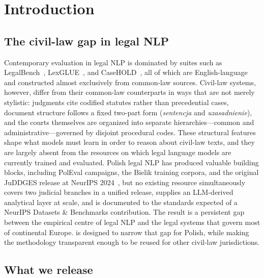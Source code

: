 
\section{Introduction}
\label{sec:introduction}

\subsection{The civil-law gap in legal NLP}
\label{sec:intro:gap}

Contemporary evaluation in legal NLP is dominated by suites such as LegalBench~\citep{guhaLegalbenchCollaborativelyBuilt2023a}, LexGLUE~\citep{chalkidis-etal-2022-lexglue}, and CaseHOLD~\citep{zheng2021does}, all of which are English-language and constructed almost exclusively from common-law sources. Civil-law systems, however, differ from their common-law counterparts in ways that are not merely stylistic: judgments cite codified statutes rather than precedential cases, document structure follows a fixed two-part form (\emph{sentencja} and \emph{uzasadnienie}), and the courts themselves are organized into separate hierarchies---common and administrative---governed by disjoint procedural codes. These structural features shape what models must learn in order to reason about civil-law texts, and they are largely absent from the resources on which legal language models are currently trained and evaluated. Polish legal NLP has produced valuable building blocks, including PolEval campaigns, the Bielik training corpora, and the original JuDDGES release at NeurIPS 2024~\citep{augustyniak2024juddges}, but no existing resource simultaneously covers two judicial branches in a unified release, supplies an LLM-derived analytical layer at scale, and is documented to the standards expected of a NeurIPS Datasets \& Benchmarks contribution. The result is a persistent gap between the empirical centre of legal NLP and the legal systems that govern most of continental Europe. \juddgespl{} is designed to narrow that gap for Polish, while making the methodology transparent enough to be reused for other civil-law jurisdictions.

\subsection{What we release}
\label{sec:intro:release}

